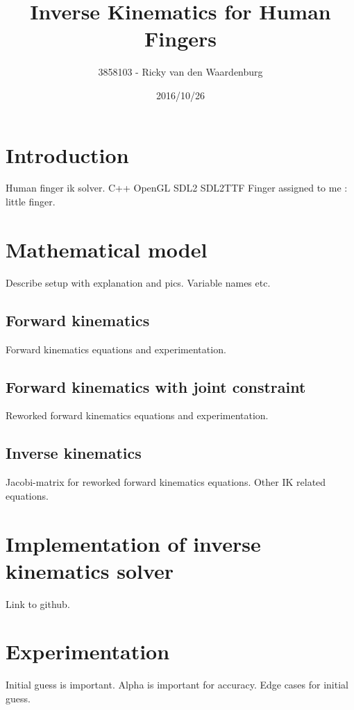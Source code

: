 \documentclass{article}
\title{Inverse Kinematics for Human Fingers}
\date{2016/10/26}
\author{3858103 - Ricky van den Waardenburg}
\begin{document}
\maketitle
\newpage

\section{Introduction}

Human finger ik solver. C++ OpenGL SDL2 SDL2TTF Finger assigned to me : little finger.

\section{Mathematical model}

Describe setup with explanation and pics. Variable names etc.

\subsection{Forward kinematics}

Forward kinematics equations and experimentation.

\subsection{Forward kinematics with joint constraint}

Reworked forward kinematics equations and experimentation.

\subsection{Inverse kinematics}

Jacobi-matrix for reworked forward kinematics equations. Other IK related equations.

\section{Implementation of inverse kinematics solver}

Link to github.

\section{Experimentation}

Initial guess is important. Alpha is important for accuracy. Edge cases for initial guess.  
\end{document}
